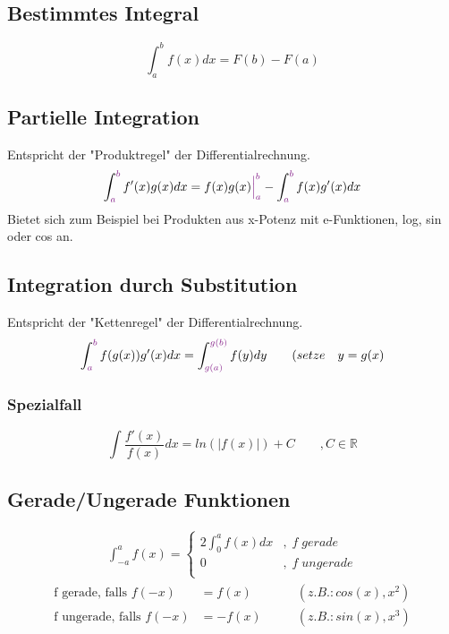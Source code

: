 \documentclass[12pt,a4paper]{article}%
\numberwithin{equation}{section}
\newcommand{\R}{\mathbb{R}} %
\def\colBord#1{\begingroup\color{Fuchsia}{#1}\endgroup}
\numberwithin{equation}{subsection}
\begin{document}
\subsection{Bestimmtes Integral}
\begin{equation}
\int_a^b f(x) dx = F(b) - F(a) \label{eq:def_border}
\end{equation}

\subsection{Partielle Integration}
Entspricht der "Produktregel" der Differentialrechnung.
\begin{equation}
\int_{\colBord{a}}^{\colBord{b}} f'(x) g(x) dx = f(x) g(x) \colBord{\Big|_a^b} - \int_{\colBord{a}}^{\colBord{b}} f(x) g'(x) dx \label{eq:rule_partInt}
\end{equation}
Bietet sich zum Beispiel bei Produkten aus x-Potenz mit e-Funktionen, log, sin oder cos an.

\subsection{Integration durch Substitution}
Entspricht der "Kettenregel" der Differentialrechnung.
\begin{equation}
\int_{\colBord{a}}^{\colBord{b}} f(g(x))g'(x) dx = \int_{\colBord{g(a)}}^{\colBord{g(b)}} f(y) dy \qquad (setze \quad y = g(x) \label{eq:rule_subs}
\end{equation}

\subsubsection{Spezialfall}
\begin{equation}
\int \frac{f'(x)}{f(x)} dx = ln(|f(x)|) + C \qquad ,C\in\R \label{eq:rule_spec}
\end{equation}

\newpage

\subsection{Gerade/Ungerade Funktionen}
\begin{align}
\int_{-a}^a f(x) = 
\begin{cases}
2 \int_0^a f(x) dx &,\; f\; gerade\\
0 &,\; f\; ungerade\\
\end{cases} \label{eq:evenodd}
\end{align}
\begin{align*}
\text{f gerade, falls }f(-x) &= f(x) \qquad &(z.B.: cos(x), x^2)\\
\text{f ungerade, falls }f(-x) &= -f(x) \qquad &(z.B.: sin(x), x^3)\\
\end{align*}
\end{document}
